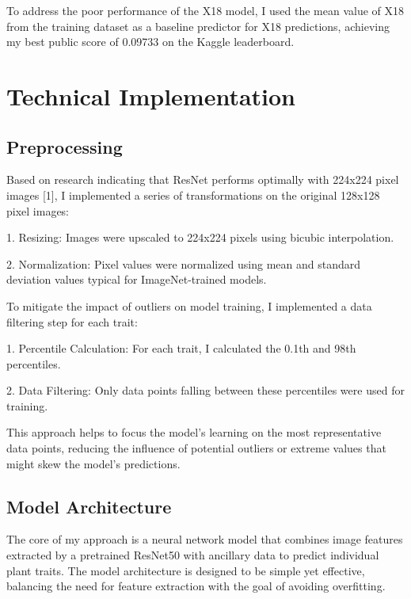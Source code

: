\documentclass{article}
\begin{document}
To address the poor performance of the X18 model, I used the mean value of X18 from the training dataset as a baseline predictor for X18 predictions, achieving my best public score of 0.09733 on the Kaggle leaderboard.

\section{Technical Implementation}

\subsection{Preprocessing}

Based on research indicating that ResNet performs optimally with 224x224 pixel images [1], I implemented a series of transformations on the original 128x128 pixel images:

1. Resizing: Images were upscaled to 224x224 pixels using bicubic interpolation.

2. Normalization: Pixel values were normalized using mean and standard deviation values typical for ImageNet-trained models.

To mitigate the impact of outliers on model training, I implemented a data filtering step for each trait:

1. Percentile Calculation: For each trait, I calculated the 0.1th and 98th percentiles.

2. Data Filtering: Only data points falling between these percentiles were used for training.

This approach helps to focus the model's learning on the most representative data points, reducing the influence of potential outliers or extreme values that might skew the model's predictions.

\subsection{Model Architecture}

The core of my approach is a neural network model that combines image features extracted by a pretrained ResNet50 with ancillary data to predict individual plant traits. The model architecture is designed to be simple yet effective, balancing the need for feature extraction with the goal of avoiding overfitting. 
\end{document}
